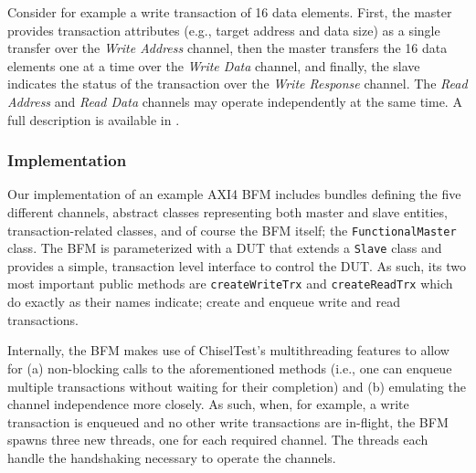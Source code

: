 \documentclass[conference]{IEEEtran}
\begin{document}

Consider for example a write transaction of 16 data elements. First, the master provides transaction attributes (e.g., target address and data size) as a single transfer over the \textit{Write Address} channel, then the master transfers the 16 data elements one at a time over the \textit{Write Data} channel, and finally, the slave indicates the status of the transaction over the \textit{Write Response} channel. The \textit{Read Address} and \textit{Read Data} channels may operate independently at the same time. A full description is available in \cite{axi4standard}.

\subsubsection{Implementation}
Our implementation of an example AXI4 BFM includes bundles defining the five different channels, abstract classes representing both master and slave entities, transaction-related classes, and of course the BFM itself; the \texttt{FunctionalMaster} class. The BFM is parameterized with a DUT that extends a \texttt{Slave} class and provides a simple, transaction level interface to control the DUT. As such, its two most important public methods are \texttt{createWriteTrx} and \texttt{createReadTrx} which do exactly as their names indicate; create and enqueue write and read transactions.

Internally, the BFM makes use of ChiselTest's multithreading features to allow for (a) non-blocking calls to the aforementioned methods (i.e., one can enqueue multiple transactions without waiting for their completion) and (b) emulating the channel independence more closely. As such, when, for example, a write transaction is enqueued and no other write transactions are in-flight, the BFM spawns three new threads, one for each required channel. The threads each handle the handshaking necessary to operate the channels.
\end{document}
